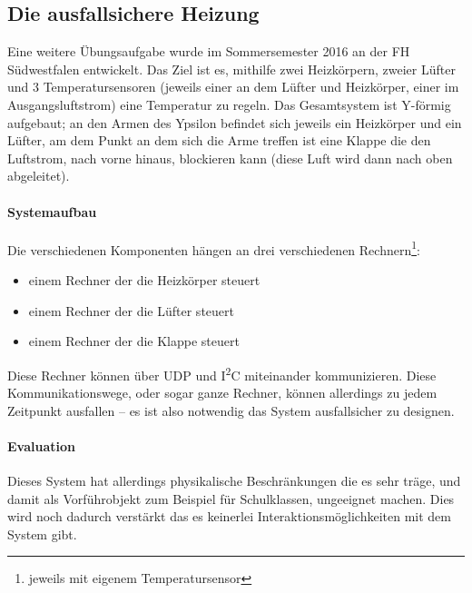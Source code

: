 \documentclass[
    12pt,
    bibliography=totoc,
    ngerman
]{scrartcl}
\begin{document}
\subsection{Die ausfallsichere Heizung}
Eine weitere {\"{U}}bungsaufgabe wurde im Sommersemester 2016 an der FH S{\"{u}}dwestfalen entwickelt. Das Ziel ist es, mithilfe zwei Heizk{\"{o}}rpern, zweier
L{\"{u}}fter und 3 Temperatursensoren (jeweils einer an dem L{\"{u}}fter und Heizk{\"{o}}rper, einer im Ausgangsluftstrom) eine Temperatur zu regeln.
Das Gesamtsystem ist Y-f{\"{o}}rmig aufgebaut; an den Armen des Ypsilon befindet sich jeweils ein Heizk{\"{o}}rper und ein L{\"{u}}fter, am dem Punkt an dem sich
die Arme treffen ist eine Klappe die den Luftstrom, nach vorne hinaus, blockieren kann (diese Luft wird dann nach oben abgeleitet).

\paragraph{Systemaufbau} Die verschiedenen Komponenten h{\"{a}}ngen an drei verschiedenen Rechnern\footnote{jeweils mit eigenem Temperatursensor}:
\begin{itemize}
\item einem Rechner der die Heizk{\"{o}}rper steuert
\item einem Rechner der die L{\"{u}}fter steuert
\item einem Rechner der die Klappe steuert
\end{itemize}

Diese Rechner k{\"{o}}nnen {\"{u}}ber UDP und I\textsuperscript{2}C miteinander kommunizieren. Diese Kommunikationswege, oder sogar ganze Rechner, k{\"{o}}nnen
allerdings zu jedem Zeitpunkt ausfallen -- es ist also notwendig das System ausfallsicher zu designen.


\paragraph{Evaluation} Dieses System hat allerdings physikalische Beschr{\"{a}}nkungen die es sehr
tr{\"{a}}ge, und damit als Vorf{\"{u}}hrobjekt zum Beispiel f{\"{u}}r Schulklassen,
ungeeignet machen. Dies wird noch dadurch verst{\"{a}}rkt das es keinerlei
Interaktionsm{\"{o}}glichkeiten mit dem System gibt.


\clearpage
\end{document}
